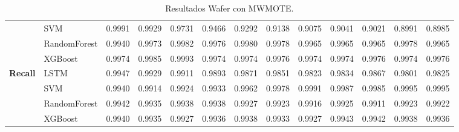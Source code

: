\begin{table}[h]
\begin{adjustbox}{max width=15cm}
\begin{tabular}{|c|l|r|r|r|r|r|r|r|r|r|r|r|}
			& SVM &  0.9991 &  0.9929 &  0.9731 &  0.9466 &  0.9292 &  0.9138 &  0.9075 &  0.9041 &  0.9021 &  0.8991 &  0.8985 \\
			& RandomForest &  0.9940 &  0.9973 &  0.9982 &  0.9976 &  0.9980 &  0.9978 &  0.9965 &  0.9965 &  0.9965 &  0.9978 &  0.9965 \\
			& XGBoost &  0.9974 &  0.9985 &  0.9993 &  0.9974 &  0.9974 &  0.9976 &  0.9974 &  0.9974 &  0.9976 &  0.9974 &  0.9976 \\
			\hline
			\textbf{Recall} & LSTM &  0.9947 &  0.9929 &  0.9911 &  0.9893 &  0.9871 &  0.9851 &  0.9823 &  0.9834 &  0.9867 &  0.9801 &  0.9825 \\
			& SVM &  0.9940 &  0.9914 &  0.9924 &  0.9933 &  0.9962 &  0.9978 &  0.9991 &  0.9987 &  0.9985 &  0.9995 &  0.9995 \\
			& RandomForest &  0.9942 &  0.9935 &  0.9938 &  0.9938 &  0.9927 &  0.9923 &  0.9916 &  0.9925 &  0.9911 &  0.9923 &  0.9922 \\
			& XGBoost &  0.9940 &  0.9935 &  0.9927 &  0.9936 &  0.9938 &  0.9933 &  0.9927 &  0.9943 &  0.9942 &  0.9938 &  0.9936 \\
			\hline
		\end{tabular}
	\end{adjustbox}
	\caption{Resultados Wafer con MWMOTE.}
	\label{tab:Wafer_MWMOTE}
\end{table}

